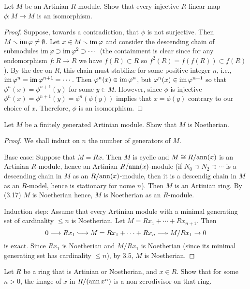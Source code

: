 \newpage
\begin{problem}
Let $M$ be an Artinian $R$-module. Show that every injective
$R$-linear map $\phi\colon M\to M$ is an isomorphism.
\end{problem}
\begin{proof}
Suppose, towards a contradiction, that $\phi$ is not
surjective. Then $M\smallsetminus\operatorname{im}\varphi\neq\emptyset$. Let $x\in
M\smallsetminus\operatorname{im}\varphi$ and consider the descending chain of
submodules $\operatorname{im}\varphi\supset\operatorname{im}\varphi^2\supset\cdots$ (the
containment is clear since for any endomorphism $f\colon R\to R$
we have $f(R)\subset R$ so $f^2(R)=f(f(R))\subset f(R)$). By the
dcc on $R$, this chain must stabilize for some positive integer
$n$, i.e., $\operatorname{im}\varphi^n=\operatorname{im}\varphi^{n+1}=\cdots$. Then
$\varphi^n(x)\in\operatorname{im}\varphi^n$, but $\varphi^n(x)\in\operatorname{im}\varphi^{n+1}$ so that
$\phi^n(x)=\phi^{n+1}(y)$ for some $y\in M$. However, since
$\phi$ is injective $\phi^n(x)=\phi^{n+1}(y)=\phi^n(\phi(y))$
implies that $x=\phi(y)$ contrary to our choice of
$x$. Therefore, $\phi$ is an isomorphism.
\end{proof}
\newpage
\begin{problem}
Let $M$ be a finitely generated Artinian module. Show that $M$ is
Noetherian.
\end{problem}
\begin{proof}
We shall induct on $n$ the number of generators of $M$.

Base case: Suppose that $M=Rx$. Then $M$ is cyclic and $M\cong
R/{\operatorname{ann}(x)}$ is an Artinian $R$-module, hence an Artinian
$R/{\operatorname{ann}(x)}$-module (if $N_0\supset N_2\supset\cdots$ is a
descending chain in $M$ as an $R/{\operatorname{ann}(x)}$-module, then it is a
descendig chain in $M$ as an $R$-model, hence is stationary for
nome $n$). Then $M$ is an Artinian ring. By (3.17) $M$ is
Noetherian hence, $M$ is Noetherian as an $R$-module.

Induction step: Assume that every Artinian module with a minimal
generating set of cardinality $\leq n$ is Noetherian. Let
$M=Rx_1+\cdots+Rx_{n+1}$. Then
\[
0
\longrightarrow
Rx_1
\hooklongrightarrow
M=Rx_1+\cdots+Rx_n
\twoheadlongrightarrow
M/Rx_1
\rightarrow
0
\]
is exact. Since $Rx_1$ is Noetherian and $M/Rx_1$ is Noetherian
(since its minimal generating set has cardinality $\leq n$), by
3.5,  $M$ is Noetherian.
\end{proof}
\newpage
\begin{problem}
Let $R$ be a ring that is Artinian or Noetherian, and $x\in
R$. Show that for some $n>0$, the image of $x$ in $R/(\operatorname{ann} x^n)$
is a non-zerodivisor on that ring.
\end{problem}
